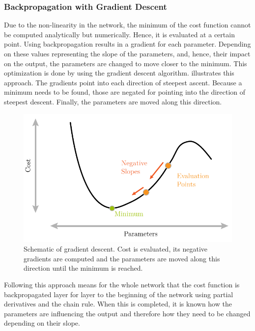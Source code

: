 \subsubsection{Backpropagation with Gradient Descent}
\label{sec:training-gradient-descent}
Due to the non-linearity in the network, the minimum of the cost function cannot be computed analytically but numerically.
Hence, it is evaluated at a certain point.
Using backpropagation\cite{rumelhart1986learning}\cite{Goodfellow-et-al-2016} results in a gradient for each parameter.
Depending on these values representing the slope of the parameters, and, hence, their impact on the output, the parameters are changed to move closer to the minimum.
This optimization is done by using the gradient descent algorithm\cite{kiefer1952}\cite{robbins1951}.
 illustrates this approach.
The gradients point into each direction of steepest ascent.
Because a minimum needs to be found, those are negated for pointing into the direction of steepest descent.
Finally, the parameters are moved along this direction.
\begin{figure}
	\centering
	\includegraphics{images/gradient_descent.pdf}
	\caption[Schematic of Gradient Descent]{Schematic of gradient descent. Cost is evaluated, its negative gradients are computed and the parameters are moved along this direction until the minimum is reached.}
	\label{fig:gradient-descent}
\end{figure}
Following this approach means for the whole network that the cost function is backpropagated layer for layer to the beginning of the network using partial derivatives and the chain rule.
When this is completed, it is known how the parameters are influencing the output and therefore how they need to be changed depending on their slope.


